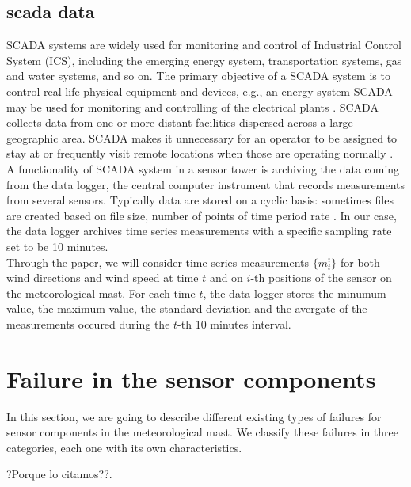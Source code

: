 \documentclass[journal]{IEEEtran}
\begin{document}
\subsection{scada data}\label{subsec:scadaData}
SCADA systems are widely used for monitoring and control of Industrial Control System (ICS), including the emerging energy system, transportation systems, gas and water systems, and so on. The primary objective of a SCADA system is to control real-life physical equipment and devices, e.g., an energy system SCADA may be used for monitoring and controlling of the electrical plants \cite{ahmed2015investigation}. SCADA collects data from one or more distant facilities dispersed across a large geographic area. SCADA makes it unnecessary for an operator to be assigned to stay at or frequently visit remote locations when those are operating normally \cite{boyer2009scada}. \\
A functionality of SCADA system in a sensor tower is archiving the data coming from the data logger, the central computer instrument that records measurements from several sensors. Typically data are stored  on a cyclic basis: sometimes files are created based on file size, number of points of time period rate \cite{daneels1999scada}. In our case, the data logger archives time series measurements with a specific sampling rate set to be 10 minutes. \\
Through the paper, we will consider time series measurements $\{m_t^i\}$ for both wind directions and wind speed at time $t$ and on $i$-th positions of the sensor on the meteorological mast. For each time $t$, the data logger stores the minumum value, the maximum value, the standard deviation and the avergate of the measurements occured during the $t$-th 10 minutes interval.

\section{Failure in the sensor components}\label{sec:failures}
In this section, we are going to describe different existing types of failures for sensor components in the meteorological mast. We classify these failures in three categories, each one with its own characteristics.


?Porque lo citamos??\cite{chandola2009anomaly}.
\end{document}
